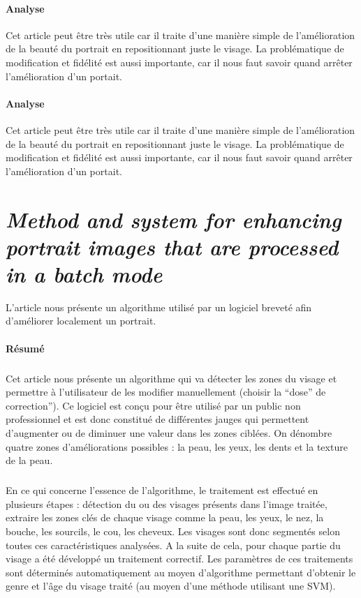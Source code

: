\documentclass[11pt, french]{report-rd-info}
\begin{document}
\paragraph{Analyse}
Cet article peut être très utile car il traite d'une manière simple de l'amélioration de la beauté du portrait en repositionnant juste le visage. La problématique de modification et fidélité est aussi importante, car il nous faut savoir quand arrêter l'amélioration d'un portait.

\paragraph{Analyse}
Cet article peut être très utile car il traite d'une manière simple de l'amélioration de la beauté du portrait en repositionnant juste le visage. La problématique de modification et fidélité est aussi importante, car il nous faut savoir quand arrêter l'amélioration d'un portait.

\section{\emph{Method and system for enhancing portrait images that are processed in a batch mode}}
L'article \cite{Matraszek2004} nous présente un algorithme utilisé par un logiciel breveté afin d'améliorer localement un portrait.

\paragraph{Résumé}
\subparagraph{}
Cet article nous présente un algorithme qui va détecter les zones du visage et permettre à l'utilisateur de les modifier manuellement (choisir la “dose” de correction”). Ce logiciel est conçu pour être utilisé par un public non professionnel et est donc constitué de différentes jauges qui permettent d'augmenter ou de diminuer une valeur dans les zones ciblées. On dénombre quatre zones d'améliorations possibles : la peau, les yeux, les dents et la texture de la peau.
\subparagraph{}
En ce qui concerne l’essence de l’algorithme, le traitement est effectué en plusieurs étapes : détection du ou des visages présents dans l’image traitée, extraire les zones clés de chaque visage comme la peau, les yeux, le nez, la bouche, les sourcils, le cou, les cheveux. Les visages sont donc segmentés selon toutes ces caractéristiques analysées. A la suite de cela, pour chaque partie du visage a été développé un traitement correctif. Les paramètres de ces traitements sont déterminés automatiquement au moyen d’algorithme permettant d’obtenir le genre et l’âge du visage traité (au moyen d’une méthode utilisant une SVM).
\end{document}
